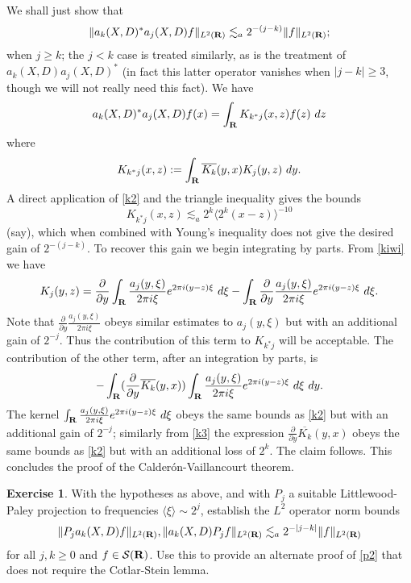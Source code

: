 \documentclass[11pt]{article}
\theoremstyle{definition}
\newtheorem{exercise}[theorem]{Exercise}
\theoremstyle{remark}
\begin{document}
 We shall just show that 
\[\displaystyle  \| a_k(X,D)^* a_j(X,D) f\|_{L^2({\bf R})} \lesssim_{a} 2^{-(j-k)} \|f\|_{L^2({\bf R})};\]
 when \({j \geq k}\); the \({j < k}\) case is treated similarly, as is the treatment of \({a_k(X,D) a_j(X,D)^*}\) (in fact this latter operator vanishes when \({|j-k| \geq 3}\), though we will not really need this fact). We have 
\[\displaystyle a_k(X,D)^* a_j(X,D) f(x) = \int_{\bf R} K_{k^*j}(x,z) f(z)\ dz\]
 where 
\[\displaystyle  K_{k^*j}(x,z) := \int_{\bf R} \overline{K_k}(y,x) K_j(y,z)\ dy.\]
 A direct application of \eqref{k2} and the triangle inequality gives the bounds 
\[\displaystyle K_{k^*j}(x,z) \lesssim_{a} 2^k \langle 2^k(x-z) \rangle^{-10}\]
 (say), which when combined with Young’s inequality does not give the desired gain of \({2^{-(j-k)}}\). To recover this gain we begin integrating by parts. From \eqref{kiwi} we have 
\[\displaystyle  K_j(y,z) =\frac{\partial}{\partial y} \int_{\bf R} \frac{a_j(y,\xi)}{2\pi i \xi} e^{2\pi i (y-z) \xi}\ d\xi - \int_{\bf R} \frac{\partial}{\partial y} \frac{a_j(y,\xi)}{2\pi i \xi} e^{2\pi i (y-z) \xi}\ d\xi.\]
 Note that \({\frac{\partial}{\partial y} \frac{a_j(y,\xi)}{2\pi i \xi}}\) obeys similar estimates to \({a_j(y,\xi)}\) but with an additional gain of \({2^{-j}}\). Thus the contribution of this term to \({K_{k^*j}}\) will be acceptable. The contribution of the other term, after an integration by parts, is 
\[\displaystyle  -\int_{\bf R} (\frac{\partial}{\partial y} \overline{K_k}(y,x)) \int_{\bf R} \frac{a_j(y,\xi)}{2\pi i \xi} e^{2\pi i (y-z) \xi}\ d\xi\ dy.\]
 The kernel \({\int_{\bf R} \frac{a_j(y,\xi)}{2\pi i \xi} e^{2\pi i (y-z) \xi}\ d\xi}\) obeys the same bounds as \eqref{k2} but with an additional gain of \({2^{-j}}\); similarly from \eqref{k3} the expression \({\frac{\partial}{\partial y} \overline{K_k}(y,x)}\) obeys the same bounds as \eqref{k2} but with an additional loss of \({2^k}\). The claim follows. This concludes the proof of the Calderón-Vaillancourt theorem.
\begin{exercise}
 \label{lp-a} With the hypotheses as above, and with \({P_j}\) a suitable Littlewood-Paley projection to frequencies \({\langle \xi \rangle \sim 2^j}\), establish the \({L^2}\) operator norm bounds 
\[\displaystyle  \| P_j a_k(X,D) f \|_{L^2({\bf R})}, \| a_k(X,D) P_j f \|_{L^2({\bf R})} \lesssim_a 2^{-|j-k|} \|f\|_{L^2({\bf R})}\]
 for all \({j,k \geq 0}\) and \({f \in {\mathcal S}({\bf R})}\). Use this to provide an alternate proof of \eqref{p2} that does not require the Cotlar-Stein lemma. 
\end{exercise}
\end{document}
